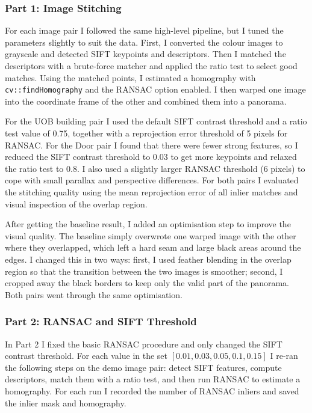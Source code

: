 \documentclass{Resources/UoBLab1}
\begin{document}
\subsubsection*{Part 1: Image Stitching}

For each image pair I followed the same high-level pipeline, but I tuned the parameters slightly to suit the data.
First, I converted the colour images to grayscale and detected SIFT keypoints and descriptors.
Then I matched the descriptors with a brute-force matcher and applied the ratio test to select good matches.
Using the matched points, I estimated a homography with \texttt{cv::findHomography} and the RANSAC option enabled.
I then warped one image into the coordinate frame of the other and combined them into a panorama.

For the UOB building pair I used the default SIFT contrast threshold and a ratio test value of 0.75, together with a reprojection error threshold of 5 pixels for RANSAC.
For the Door pair I found that there were fewer strong features, so I reduced the SIFT contrast threshold to 0.03 to get more keypoints and relaxed the ratio test to 0.8.
I also used a slightly larger RANSAC threshold (6 pixels) to cope with small parallax and perspective differences.
For both pairs I evaluated the stitching quality using the mean reprojection error of all inlier matches and visual inspection of the overlap region.

After getting the baseline result, I added an optimisation step to improve the visual quality.
The baseline simply overwrote one warped image with the other where they overlapped, which left a hard seam and large black areas around the edges.
I changed this in two ways: first, I used feather blending in the overlap region so that the transition between the two images is smoother; second, I cropped away the black borders to keep only the valid part of the panorama.
Both pairs went through the same optimisation.

\subsubsection*{Part 2: RANSAC and SIFT Threshold}

In Part 2 I fixed the basic RANSAC procedure and only changed the SIFT contrast threshold.
For each value in the set \([0.01, 0.03, 0.05, 0.1, 0.15]\) I re-ran the following steps on the demo image pair:
detect SIFT features, compute descriptors, match them with a ratio test, and then run RANSAC to estimate a homography.
For each run I recorded the number of RANSAC inliers and saved the inlier mask and homography.
\end{document}
